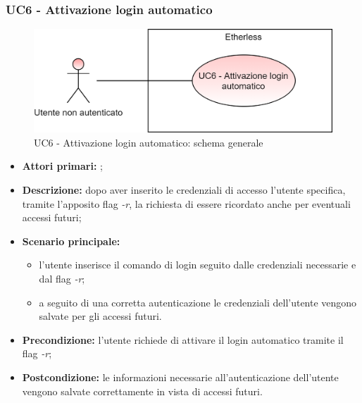 \subsubsection{UC6 - Attivazione login automatico}
\begin{figure}[h]
	\centering
	\includegraphics[scale=\ucs]{./res/img/UC6G.png}
	\caption {UC6 - Attivazione login automatico: schema generale}
\end{figure}
\begin{itemize}
	\item \textbf{Attori primari:} \una{};
	\item \textbf{Descrizione:} dopo aver inserito le credenziali di accesso l’utente specifica, tramite l’apposito flag \textit{-r}, la richiesta di essere ricordato anche per eventuali accessi futuri;
	\item \textbf{Scenario principale:} 
	\begin{itemize}
		\item l’utente inserisce il comando di login seguito dalle credenziali necessarie e dal flag \textit{-r};
		\item a seguito di una corretta autenticazione le credenziali dell’utente vengono salvate per gli accessi futuri.
	\end{itemize}
	\item \textbf{Precondizione:} l’utente richiede di attivare il login automatico tramite il flag \textit{-r};
	\item \textbf{Postcondizione:} le informazioni necessarie all’autenticazione dell’utente vengono salvate correttamente in vista di accessi futuri.
\end{itemize}